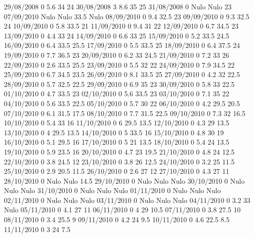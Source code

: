 29/08/2008  0      5.6    34     24 
30/08/2008  3      8.6    35     25 
31/08/2008  0     Nulo   Nulo    23 
07/09/2010 Nulo   Nulo    33.5  Nulo
08/09/2010  0      9.4    32.5   23 
09/09/2010  0      9.3    32.5   24 
10/09/2010  0      5.8    33.5   21 
11/09/2010  0      9.4    31     22 
12/09/2010  0      6.7    34.5   23 
13/09/2010  0      4.4    33     24 
14/09/2010  0      6.6    33     25 
15/09/2010  0      5.2    33.5   24.5 
16/09/2010  0      6.4    33.5   25.5 
17/09/2010  0      5.5    33.5   25 
18/09/2010  0      6.4    37.5   24 
19/09/2010  0      7.7    36.5   23 
20/09/2010  0      6.2    33     24.5 
21/09/2010  0      7.2    33     26 
22/09/2010  0      2.6    33.5   25.5 
23/09/2010  0      5.5    32     22 
24/09/2010  0      7.9    34.5   22 
25/09/2010  0      6.7    34.5   23.5 
26/09/2010  0      8.1    33.5   25 
27/09/2010  0      4.2    32     22.5 
28/09/2010  0      5.7    32.5   22.5 
29/09/2010  0      6.9    35     23 
30/09/2010  0      5.8    33     22.5 
01/10/2010  0      4.7    33.5   23 
02/10/2010  0      5.6    33.5   23 
03/10/2010  0      7.1    35     22 
04/10/2010  0      5.6    33.5   22.5 
05/10/2010  0      5.7    30     22 
06/10/2010  0      4.2    29.5   20.5 
07/10/2010  0      6.1    31.5   17.5 
08/10/2010  0      7.7    31.5   22.5 
09/10/2010  0      7.3    32     16.5 
10/10/2010  0      5.4    33     16 
11/10/2010  0      6      29.5   13.5 
12/10/2010  0      4.3    29     13.5 
13/10/2010  0      4      29.5   13.5 
14/10/2010  0      5      33.5   16 
15/10/2010  0      4.8    30     19 
16/10/2010  0      5.1    29.5   16 
17/10/2010  0      5      21     13.5 
18/10/2010  0      5.4    24     13.5 
19/10/2010  0      5.9    23.5   16 
20/10/2010  0      4.7    23     19.5 
21/10/2010  0      4.8    24     12.5 
22/10/2010  0      3.8    24.5   12 
23/10/2010  0      3.8    26     12.5 
24/10/2010  0      3.2    25     11.5 
25/10/2010  0      2.9    20.5   11.5 
26/10/2010  0      2.6    27     12 
27/10/2010  0      4.3    27     11 
28/10/2010  0     Nulo   Nulo    14.5 
29/10/2010  0     Nulo   Nulo   Nulo
30/10/2010  0     Nulo   Nulo   Nulo
31/10/2010  0     Nulo   Nulo   Nulo
01/11/2010  0     Nulo   Nulo   Nulo
02/11/2010  0     Nulo   Nulo   Nulo
03/11/2010  0     Nulo   Nulo   Nulo
04/11/2010  0      3.2    33    Nulo
05/11/2010  0      4.1    27     11 
06/11/2010  0      4      29     10.5 
07/11/2010  0      3.8    27.5   10 
08/11/2010  0      3.4    25.5   9 
09/11/2010  0      4.2    24     9.5 
10/11/2010  0      4.6    22.5   8.5 
11/11/2010  0      3      24     7.5 
